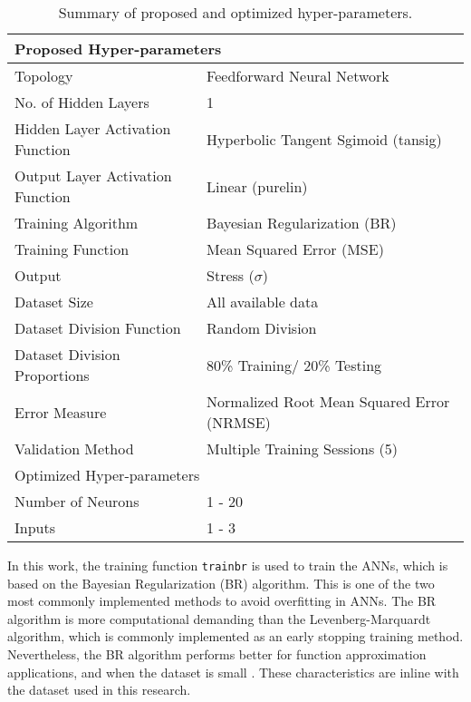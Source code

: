 \begin{table}[!htb]
    \centering
    \caption{Summary of proposed and optimized hyper-parameters.}
    \begin{tabular}{l l}
    \toprule
    \multicolumn{2}{l}{Proposed Hyper-parameters} \\
    \hline
    Topology                         & Feedforward Neural Network \\
    No. of Hidden Layers             & 1 \\
    Hidden Layer Activation Function & Hyperbolic Tangent Sgimoid (tansig)\\
    Output Layer Activation Function & Linear (purelin)\\
    Training Algorithm               & Bayesian Regularization (BR)\\
    Training Function                & Mean Squared Error (MSE)\\
    Output                           & Stress ($\sigma$)\\
    Dataset Size                     & All available data\\
    Dataset Division Function        & Random Division  \\
    Dataset Division Proportions     & 80\% Training/ 20\% Testing\\
    Error Measure                    & Normalized Root Mean Squared Error (NRMSE)\\
    Validation Method                & Multiple Training Sessions (5)\\
    \midrule
    \multicolumn{2}{l}{Optimized Hyper-parameters}\\
    \hline
    Number of Neurons            & 1 - 20 \\
    Inputs                       & 1 - 3 \\
    \bottomrule
    \end{tabular}
    \label{tbl:ANN_parameters}
\end{table}

In this work, the training function \texttt{trainbr} is used to train the ANNs, which is based on the Bayesian Regularization (BR) algorithm. This is one of the two most commonly implemented methods to avoid overfitting in ANNs. The BR algorithm is more computational demanding than the Levenberg-Marquardt algorithm, which is commonly implemented as an early stopping training method. Nevertheless, the BR algorithm performs better for function approximation applications, and when the dataset is small \cite{matlab2019improve}. These characteristics are inline with the dataset used in this research.

